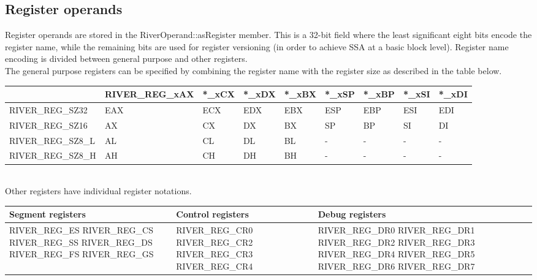 \documentclass[12pt]{report}
\begin{document}
\subsection{Register operands}
\label{ssec:register-operands}
Register operands are stored in the RiverOperand::asRegister member. This is a 32-bit field where the least significant eight bits encode the register name, while the remaining bits are used for register versioning (in order to achieve SSA at a basic block level). Register name encoding is divided between general purpose and other registers.\\
\newline
The general purpose registers can be specified by combining the register name with the register size as described in the table below.\\
\begin{tabular}{| p{3.6cm} | p{3.2cm} | p{1cm} | p{1cm} | p{1cm} | p{1cm} | p{1cm} | p{1cm} | p{1cm} |}
\hline
& RIVER_REG_xAX & *_xCX & *_xDX & *_xBX & *_xSP & *_xBP & *_xSI & *_xDI\\ \hline
RIVER_REG_SZ32 & EAX & ECX & EDX & EBX & ESP & EBP & ESI & EDI\\ \hline
RIVER_REG_SZ16 & AX & CX & DX & BX & SP & BP & SI & DI\\ \hline
RIVER_REG_SZ8_L & AL & CL & DL & BL & - & - & - & -\\ \hline
RIVER_REG_SZ8_H & AH & CH & DH & BH & - & - & - & -\\ \hline
\end{tabular}\\
\newline
Other registers have individual register notations.\\
\begin{tabular}{| p{5cm} | p{5cm} | p{5cm} |}
	\hline
	\textbf{Segment registers} & \textbf{Control registers} & \textbf{Debug registers} \\ \hline
	RIVER_REG_ES RIVER_REG_CS RIVER_REG_SS RIVER_REG_DS RIVER_REG_FS RIVER_REG_GS &
	RIVER_REG_CR0 RIVER_REG_CR2 RIVER_REG_CR3 RIVER_REG_CR4 &
	RIVER_REG_DR0 RIVER_REG_DR1 RIVER_REG_DR2 RIVER_REG_DR3 RIVER_REG_DR4 RIVER_REG_DR5 RIVER_REG_DR6 RIVER_REG_DR7\\ \hline
\end{tabular}\\
\end{document}
